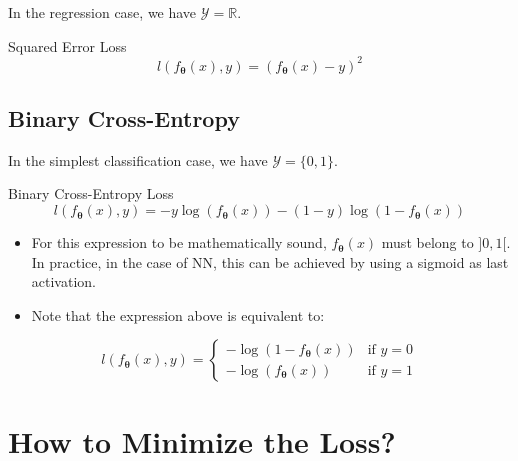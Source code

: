 \documentclass{book}
\newcommand{\param}{\boldsymbol{\theta}}
\newcommand{\R}{\mathbb{R}}
\begin{document}
In the regression case, we have $\mathcal{Y} = \R$.

\begin{myblock}{Squared Error Loss}
\[
l(f_{\param}(x), y) = (f_{\param}(x) - y)^2
\]
\end{myblock}

\subsection{Binary Cross-Entropy}

In the simplest classification case, we have $\mathcal{Y}=\{0, 1\}$.

\begin{myblock}{Binary Cross-Entropy Loss}
\[
l(f_{\param}(x), y) = - y \log(f_{\param}(x)) - (1 - y) \log(1 - f_{\param}(x))
\]
\end{myblock}

\begin{itemize}
\item For this expression to be mathematically sound, $f_{\param}(x)$ must belong to $]0, 1[$. In practice, in the case of NN, this can be achieved by using a sigmoid as last activation.
\item Note that the expression above is equivalent to:
\end{itemize}

\[
l(f_{\param}(x), y) = \left\{
\begin{array}{ll}
- \log(1 - f_{\param}(x)) & \mbox{if } y=0 \\
- \log(f_{\param}(x)) & \mbox{if } y=1
\end{array}
\right.
\]

\section{How to Minimize the Loss?}
\end{document}
